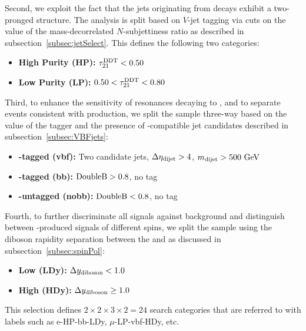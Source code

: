 Second, we exploit the fact that the jets originating from \VorH decays exhibit a two-pronged structure.
The analysis is split based on $V$-jet tagging via cuts on the value of the mass-decorrelated $N$-subjettiness ratio \nsubjDDT as described in subsection~\ref{subsec:jetSelect}.
This defines the following two categories:
\begin{itemize}
  \item {\bfseries High Purity (HP):} $\nsubjDDT<0.50$
  \item {\bfseries Low Purity (LP):} $0.50<\nsubjDDT<0.80$
\end{itemize}

Third, to enhance the sensitivity of resonances decaying to \WHtolnubbbar, and to separate events consistent with \VBF production, we split the sample three-way based on the value of the \DoubleB tagger and the presence of \VBF-compatible jet candidates described in subsection~\ref{subsec:VBFjets}:
\begin{itemize}
  \item {\bfseries \VBF-tagged (vbf):} Two candidate \VBF jets, $\DetaVBF>4$, $\mjjVBF>500\unit{GeV}$
  \item {\bfseries \bbbar-tagged (bb):} $\DoubleB>0.8$, no \VBF tag
  \item {\bfseries \bbbar-untagged (nobb):} $\DoubleB<0.8$, no \VBF tag
\end{itemize}

Fourth, to further discriminate all signals against background and distinguish between \VBF-produced signals of different spins, we split the sample using the diboson rapidity separation \Dy between the \Wlep and \Vhad as discussed in subsection~\ref{subsec:spinPol}:
\begin{itemize}
  \item {\bfseries Low \Dy (LDy):} $\Dy<1.0$
  \item {\bfseries High \Dy (HDy):} $\Dy\geq1.0$
\end{itemize}

This selection defines $2\times2\times3\times2=24$ search categories that are referred to with labels such as e-HP-bb-LDy, $\mu$-LP-vbf-HDy, etc.
